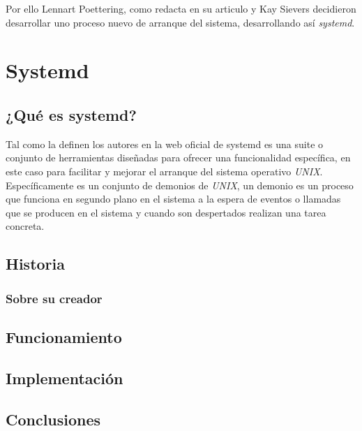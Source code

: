 Por ello Lennart Poettering, como redacta en su articulo \cite{Lennart} y
Kay Sievers decidieron desarrollar uno proceso nuevo de arranque del
sistema, desarrollando así \textit{systemd}.




\section{Systemd} %
\subsection{¿Qué es systemd?}
Tal como la definen los autores en la web oficial de systemd \cite{systemd}
es una suite o conjunto de herramientas diseñadas para ofrecer una 
funcionalidad específica, en este caso para facilitar y mejorar el arranque
del sistema operativo \textit{UNIX}. Específicamente es un conjunto de demonios de \textit{UNIX}, un demonio \cite{daemons} es un proceso que
funciona en segundo plano en el sistema a la espera de eventos o llamadas
que se producen en el sistema y cuando son despertados realizan una tarea 
concreta. 



\subsection{Historia}

\subsubsection{Sobre su creador}

\subsection{Funcionamiento}

\subsection{Implementación}

\subsection{Conclusiones}

